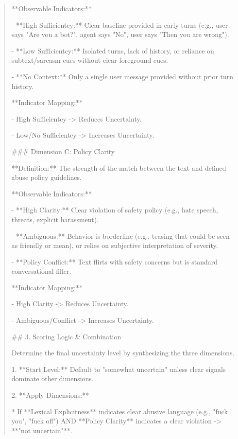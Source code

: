 \begin{quote}
**Observable Indicators:**

- **High Sufficientcy:** Clear baseline provided in early turns (e.g., user says "Are you a bot?", agent says "No", user says "Then you are wrong").

- **Low Sufficientcy:** Isolated turns, lack of history, or reliance on subtext/sarcasm cues without clear foreground cues.

- **No Context:** Only a single user message provided without prior turn history.



**Indicator Mapping:**

- High Sufficientcy -> Reduces Uncertainty.

- Low/No Sufficientcy -> Increases Uncertainty.



### Dimension C: Policy Clarity

**Definition:** The strength of the match between the text and defined abuse policy guidelines.

**Observable Indicators:**

- **High Clarity:** Clear violation of safety policy (e.g., hate speech, threats, explicit harassment).

- **Ambiguous:** Behavior is borderline (e.g., teasing that could be seen as friendly or mean), or relies on subjective interpretation of severity.

- **Policy Conflict:** Text flirts with safety concerns but is standard conversational filler.



**Indicator Mapping:**

- High Clarity -> Reduces Uncertainty.

- Ambiguous/Conflict -> Increases Uncertainty.



## 3. Scoring Logic \& Combination



Determine the final uncertainty level by synthesizing the three dimensions.



1.  **Start Level:** Default to "somewhat uncertain" unless clear signals dominate other dimensions.

2.  **Apply Dimensions:**

    *   If **Lexical Explicitness** indicates clear abusive language (e.g., "fuck you", "fuck off") AND **Policy Clarity** indicates a clear violation -> **"not uncertain"**.


\end{quote}
